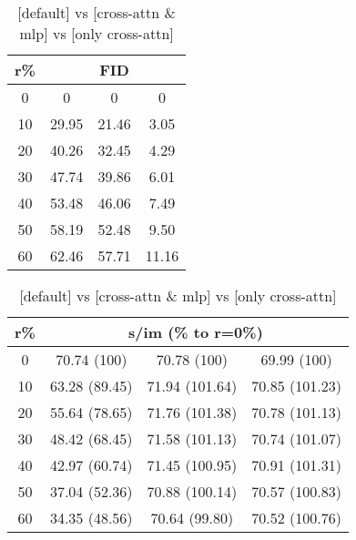 \begin{table}[htp]
\caption{[default] vs [cross-attn \& mlp] vs [only cross-attn]}
\label{table:exp_1_3}
    \begin{minipage}{0.4\textwidth}
        \begin{tabular}{|c||c|c|c|}
            \hline
            \multicolumn{1}{|c||}{r\%} & \multicolumn{3}{c|}{FID}\\
            \hline
            0 & 0 & 0 & 0 \\
            10 & 29.95 & 21.46 & 3.05 \\
            20 & 40.26 & 32.45 & 4.29 \\
            30 & 47.74 & 39.86 & 6.01 \\
            40 & 53.48 & 46.06 & 7.49 \\
            50 & 58.19 & 52.48 & 9.50 \\
            60 & 62.46 & 57.71 & 11.16 \\
            \hline
        \end{tabular}
    \end{minipage}
    \begin{minipage}{0.4\textwidth}
        \begin{tabular}{|c||c|c|c|}
            \hline
            \multicolumn{1}{|c||}{r\%} & \multicolumn{3}{c|}{s/im (\% to r=0\%)}\\
            \hline
            0 & 70.74 (100) & 70.78 (100) & 69.99 (100) \\
            10 & 63.28 (89.45) & 71.94 (101.64) & 70.85 (101.23) \\
            20 & 55.64 (78.65) & 71.76 (101.38) & 70.78 (101.13) \\
            30 & 48.42 (68.45) & 71.58 (101.13) & 70.74 (101.07) \\
            40 & 42.97 (60.74) & 71.45 (100.95) & 70.91 (101.31) \\
            50 & 37.04 (52.36) & 70.88 (100.14) & 70.57 (100.83) \\
            60 & 34.35 (48.56) & 70.64 (99.80) & 70.52 (100.76) \\
            \hline
        \end{tabular}
    \end{minipage}
\end{table}